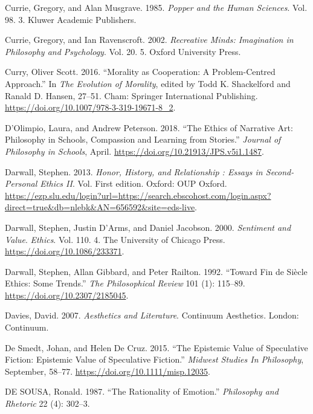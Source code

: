 \documentclass[12pt]{book}
\newenvironment{CSLReferences}%
  {\setlength{\parindent}{0pt}%
   \setlength{\leftskip}{0pt}%
   \setlength{\parskip}{0pt}}%
  {\par}
\theoremstyle{definition}
\theoremstyle{remark}
\begin{document}
\begin{CSLReferences}{1}{0}
Currie, Gregory, and Alan Musgrave. 1985. \emph{Popper and the Human Sciences}. Vol. 98. 3. Kluwer Academic Publishers.

Currie, Gregory, and Ian Ravenscroft. 2002. \emph{Recreative Minds: Imagination in Philosophy and Psychology}. Vol. 20. 5. Oxford University Press.

Curry, Oliver Scott. 2016. {``Morality as {Cooperation}: {A Problem-Centred Approach}.''} In \emph{The {Evolution} of {Morality}}, edited by Todd K. Shackelford and Ranald D. Hansen, 27--51. Cham: Springer International Publishing. \url{https://doi.org/10.1007/978-3-319-19671-8_2}.

D'Olimpio, Laura, and Andrew Peterson. 2018. {``The Ethics of Narrative Art: Philosophy in Schools, Compassion and Learning from Stories.''} \emph{Journal of Philosophy in Schools}, April. \url{https://doi.org/10.21913/JPS.v5i1.1487}.

Darwall, Stephen. 2013. \emph{Honor, {History}, and {Relationship} : {Essays} in {Second-Personal Ethics II}}. Vol. First edition. Oxford: OUP Oxford. \url{https://ezp.slu.edu/login?url=https://search.ebscohost.com/login.aspx?direct=true&db=nlebk&AN=656592&site=eds-live}.

Darwall, Stephen, Justin D'Arms, and Daniel Jacobson. 2000. \emph{Sentiment and {Value}}. \emph{Ethics}. Vol. 110. 4. The University of Chicago Press. \url{https://doi.org/10.1086/233371}.

Darwall, Stephen, Allan Gibbard, and Peter Railton. 1992. {``Toward Fin de Siècle Ethics: Some Trends.''} \emph{The Philosophical Review} 101 (1): 115--89. \url{https://doi.org/10.2307/2185045}.

Davies, David. 2007. \emph{Aesthetics and Literature}. Continuum Aesthetics. London: Continuum.

De Smedt, Johan, and Helen De Cruz. 2015. {``The Epistemic Value of Speculative Fiction: Epistemic Value of Speculative Fiction.''} \emph{Midwest Studies In Philosophy}, September, 58--77. \url{https://doi.org/10.1111/misp.12035}.

DE SOUSA, Ronald. 1987. {``The {Rationality} of {Emotion}.''} \emph{Philosophy and Rhetoric} 22 (4): 302--3.


\end{CSLReferences}
\end{document}
